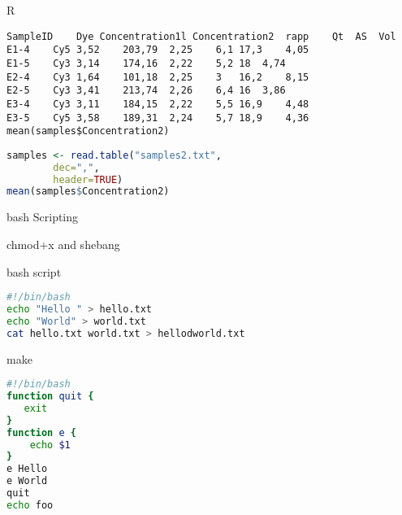 \documentclass{beamer}
\begin{document}
\begin{frame}[fragile]
 \begin{center}
    \huge{R}\\
    \end{center}
\begin{lstlisting}
SampleID	Dye	Concentration1l	Concentration2	rapp	Qt	AS	Vol
E1-4	Cy5	3,52	203,79	2,25	6,1	17,3	4,05
E1-5	Cy3	3,14	174,16	2,22	5,2	18	4,74
E2-4	Cy3	1,64	101,18	2,25	3	16,2	8,15
E2-5	Cy3	3,41	213,74	2,26	6,4	16	3,86
E3-4	Cy3	3,11	184,15	2,22	5,5	16,9	4,48
E3-5	Cy5	3,58	189,31	2,24	5,7	18,9	4,36
mean(samples$Concentration2)
\end{lstlisting}
\begin{lstlisting}[language=R]
    samples <- read.table("samples2.txt",
    	dec=",",
    	header=TRUE)
mean(samples$Concentration2)
\end{lstlisting}
\end{frame}


\begin{frame}[fragile]
 \begin{center}
    \huge{bash Scripting}\\
  \end{center}
\end{frame}

\begin{frame}[fragile]
 \begin{center}
    \huge{chmod+x and shebang}\\
  \end{center}
\end{frame}



\begin{frame}[fragile]
 \begin{center}
    \huge{bash script}\\
    \end{center}
\begin{lstlisting}[language=bash]
#!/bin/bash
echo "Hello " > hello.txt
echo "World" > world.txt
cat hello.txt world.txt > hellodworld.txt
\end{lstlisting}
\end{frame}




\begin{frame}[fragile]
 \begin{center}
    \huge{make}\\
    \end{center}
\begin{lstlisting}[language=bash]
#!/bin/bash 
function quit {
   exit
}  
function e {
    echo $1 
}  
e Hello
e World
quit
echo foo 
\end{lstlisting}
\end{frame}
\end{document}
